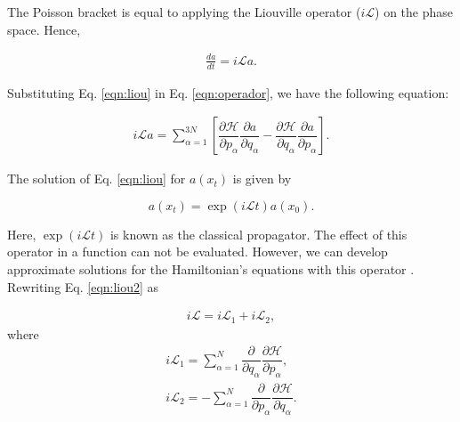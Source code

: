 The Poisson bracket is equal to applying the Liouville operator ($i\mathcal{L}$) on the phase space. Hence,

\begin{equation}
\begin{aligned}
\frac{da}{dt} = i\mathcal{L} a .
\end{aligned}
\label{eqn:liou}
\end{equation}

Substituting Eq. \ref{eqn:liou} in Eq. \ref{eqn:operador}, we have the following equation:

\begin{equation}
\begin{aligned}
i\mathcal{L} a = \sum_{\alpha=1}^{3N} \left [  \dfrac{\partial \mathcal{H}}{\partial p_{\alpha}}\dfrac{\partial a}{\partial q_{\alpha}}  -  \dfrac{\partial \mathcal{H}}{\partial q_{\alpha}} \dfrac{\partial a}{\partial p_{\alpha}} \right].
\label{eqn:liou2}
\end{aligned}
\end{equation}

The solution of Eq. \ref{eqn:liou} for $a(x_{t})$ is given by

\begin{equation}
a(x_{t}) = \exp (i\mathcal{L}t) a(x_{0}).
\label{eqn:exactsol}
\end{equation}

Here, $\exp (i\mathcal{L}t)$ is known as the classical propagator. The effect of this operator in a function can not be evaluated. However, we can develop approximate solutions for the Hamiltonian's equations with this operator \cite{tuckerman}. Rewriting Eq. \ref{eqn:liou2} as

\begin{equation}
\begin{aligned}
i\mathcal{L}  =  i\mathcal{L}_{1} + i\mathcal{L}_{2},
\end{aligned}
\end{equation}
where
\begin{equation}
\begin{aligned}
i\mathcal{L}_{1} = \sum_{\alpha=1}^{N}  \dfrac{\partial }{\partial q_{\alpha}} \dfrac{\partial \mathcal{H}}{\partial p_{\alpha}},   \\
i\mathcal{L}_{2} = - \sum_{\alpha=1}^{N} \dfrac{\partial }{\partial p_{\alpha}} \dfrac{\partial \mathcal{H}}{\partial q_{\alpha}} .
\end{aligned}
\end{equation}

